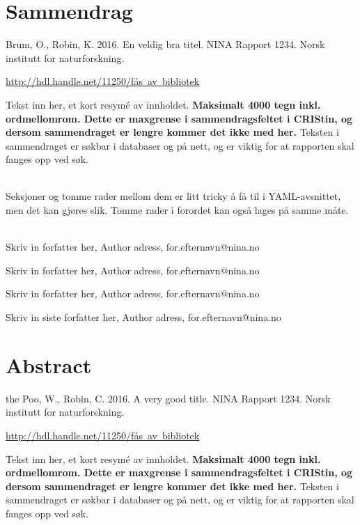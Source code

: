 \documentclass[11pt, a4paper]{article}
\renewcommand*{\href}[2]{\hyperref[#1]{\color{darkblue}\setulcolor{darkblue}\ul{\mbox{#2}}}}
\begin{document}
\section{Sammendrag}
\normalsize{Brum, O., Robin, K. 2016. En veldig bra
titel.} NINA Rapport 1234. Norsk institutt for naturforskning. \par\href{http://hdl.handle.net/11250/fås
av bibliotek}{http://hdl.handle.net/11250/fås av bibliotek} \par
\vspace{0.5cm}
\normalsize{
Tekst inn her, et kort resymé av innholdet.
\textbf{Maksimalt 4000 tegn inkl. ordmellomrom. Dette er maxgrense i sammendragsfeltet i CRIStin, og dersom sammendraget er lengre kommer det ikke med her.}
Teksten i sammendraget er søkbar i databaser og på nett, og er viktig
for at rapporten skal fanges opp ved søk.\\
\strut \\
Seksjoner og tomme rader mellom dem er litt tricky å få til i
YAML-avsnittet, men det kan gjøres slik. Tomme rader i forordet kan også
lages på samme måte.} \\

\vspace{1cm}
\small
Skriv in forfatter her, Author adress, for.efternavn@nina.no  \par
Skriv in forfatter her, Author adress, for.efternavn@nina.no  \par
Skriv in forfatter her, Author adress, for.efternavn@nina.no  \par
Skriv in siste forfatter her, Author adress, for.efternavn@nina.no  \par
\normalsize
\clearpage

\setcounter{secnumdepth}{0}
\section{Abstract}
\small{the Poo, W., Robin, C. 2016. A very good
title.} NINA Rapport 1234. Norsk institutt for naturforskning. \par\href{http://hdl.handle.net/11250/fås
av bibliotek}{http://hdl.handle.net/11250/fås av bibliotek}\par
\vspace{0.5cm}
\normalsize{
Tekst inn her, et kort resymé av innholdet.
\textbf{Maksimalt 4000 tegn inkl. ordmellomrom. Dette er maxgrense i sammendragsfeltet i CRIStin, og dersom sammendraget er lengre kommer det ikke med her.}
Teksten i sammendraget er søkbar i databaser og på nett, og er viktig
for at rapporten skal fanges opp ved søk.} \\
\end{document}
